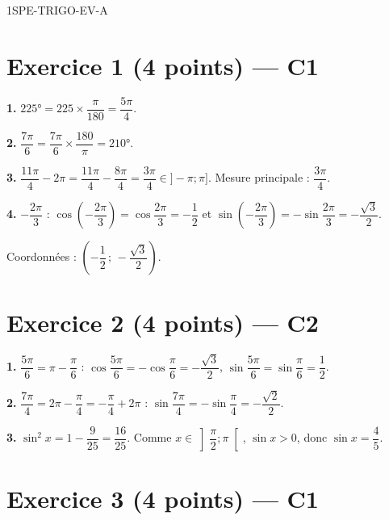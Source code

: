 \begin{corrige}{1SPE-TRIGO-EV-A}

\section*{Exercice 1 \hfill (4 points) — C1}


\textbf{1.} $225° = 225 \times \dfrac{\pi}{180} = \dfrac{5\pi}{4}$.

\textbf{2.} $\dfrac{7\pi}{6} = \dfrac{7\pi}{6} \times \dfrac{180}{\pi} = 210°$.

\textbf{3.} $\dfrac{11\pi}{4} - 2\pi = \dfrac{11\pi}{4} - \dfrac{8\pi}{4} = \dfrac{3\pi}{4} \in {]-\pi;\pi]}$. Mesure principale : $\dfrac{3\pi}{4}$.

\textbf{4.} $-\dfrac{2\pi}{3}$ : $\cos\!\left(-\dfrac{2\pi}{3}\right) = \cos\dfrac{2\pi}{3} = -\dfrac{1}{2}$ et $\sin\!\left(-\dfrac{2\pi}{3}\right) = -\sin\dfrac{2\pi}{3} = -\dfrac{\sqrt{3}}{2}$.

Coordonnées : $\left(-\dfrac{1}{2}\,;\,-\dfrac{\sqrt{3}}{2}\right)$.

\section*{Exercice 2 \hfill (4 points) — C2}


\textbf{1.} $\dfrac{5\pi}{6} = \pi - \dfrac{\pi}{6}$ :
$\cos\dfrac{5\pi}{6} = -\cos\dfrac{\pi}{6} = -\dfrac{\sqrt{3}}{2}$, \quad $\sin\dfrac{5\pi}{6} = \sin\dfrac{\pi}{6} = \dfrac{1}{2}$.

\textbf{2.} $\dfrac{7\pi}{4} = 2\pi - \dfrac{\pi}{4} = -\dfrac{\pi}{4} + 2\pi$ :
$\sin\dfrac{7\pi}{4} = -\sin\dfrac{\pi}{4} = -\dfrac{\sqrt{2}}{2}$.

\textbf{3.} $\sin^2 x = 1 - \dfrac{9}{25} = \dfrac{16}{25}$. Comme $x \in \left]\dfrac{\pi}{2};\pi\right[$, $\sin x > 0$, donc $\sin x = \dfrac{4}{5}$.

\section*{Exercice 3 \hfill (4 points) — C1}


\end{corrige}
